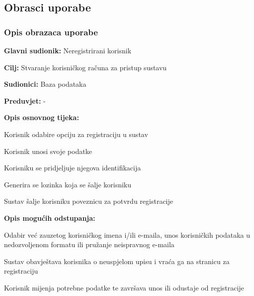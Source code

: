 	\eject 
	
			
			
				
			\subsection{Obrasci uporabe}
			
				
				\subsubsection{Opis obrazaca uporabe}
					

					\noindent {}
					\begin{packed_item}
	
						\item \textbf{Glavni sudionik: }Neregistrirani korisnik
						\item  \textbf{Cilj:} Stvaranje korisničkog računa za pristup sustavu
						\item  \textbf{Sudionici:} Baza podataka
						\item  \textbf{Preduvjet:} -
						\item  \textbf{Opis osnovnog tijeka:}
						
						\item[] \begin{packed_enum}
							
							\item Korisnik odabire opciju za registraciju u sustav
							\item Korisnik unosi svoje podatke
							\item Korisniku se pridjeljuje njegova identifikacija
							\item Generira se lozinka koja se šalje korisniku
							\item Sustav šalje korisniku poveznicu za potvrdu registracije
							
						\end{packed_enum}
						
						\item  \textbf{Opis mogućih odstupanja:}
						
						\item[] \begin{packed_item}
	
							\item[2.a] Odabir već zauzetog korisničkog imena i/ili e-maila, unos korisničkih podataka u nedozvoljenom formatu ili pružanje neispravnog e-maila
							\item[] \begin{packed_enum}
								
								\item Sustav obavještava korisnika o neuspjelom upisu i vraća ga na stranicu za registraciju
								\item Korisnik mijenja potrebne podatke te završava unos ili odustaje od registracije
								
							\end{packed_enum}
						\end{packed_item}
					\end{packed_item}
				
